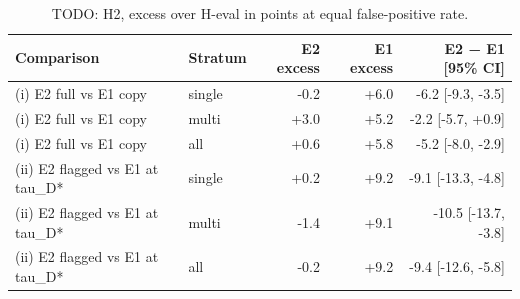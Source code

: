 \begin{table}
\centering
\footnotesize
\begin{tabular}{llrrr}
\toprule
Comparison & Stratum & E2 excess & E1 excess & E2 − E1 [95\% CI] \\
\midrule
(i) E2 full vs E1 copy & single & -0.2 & +6.0 & -6.2 [-9.3, -3.5] \\
(i) E2 full vs E1 copy & multi & +3.0 & +5.2 & -2.2 [-5.7, +0.9] \\
(i) E2 full vs E1 copy & all & +0.6 & +5.8 & -5.2 [-8.0, -2.9] \\
(ii) E2 flagged vs E1 at tau\_D* & single & +0.2 & +9.2 & -9.1 [-13.3, -4.8] \\
(ii) E2 flagged vs E1 at tau\_D* & multi & -1.4 & +9.1 & -10.5 [-13.7, -3.8] \\
(ii) E2 flagged vs E1 at tau\_D* & all & -0.2 & +9.2 & -9.4 [-12.6, -5.8] \\
\bottomrule
\end{tabular}
\caption{TODO: H2, excess over H-eval in points at equal false-positive rate.}
\label{tab:h2}
\end{table}
